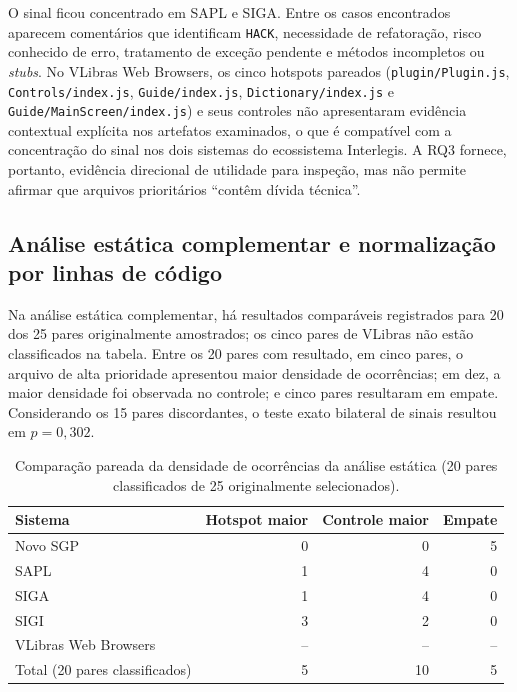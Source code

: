 \documentclass[12pt]{article}
\begin{document}
O sinal ficou concentrado em SAPL e SIGA. Entre os casos encontrados aparecem comentários que identificam \texttt{HACK}, necessidade de refatoração, risco conhecido de erro, tratamento de exceção pendente e métodos incompletos ou \emph{stubs}. No VLibras Web Browsers, os cinco hotspots pareados (\texttt{plugin/Plugin.js}, \texttt{Controls/index.js}, \texttt{Guide/index.js}, \texttt{Dictionary/index.js} e \texttt{Guide/MainScreen/index.js}) e seus controles não apresentaram evidência contextual explícita nos artefatos examinados, o que é compatível com a concentração do sinal nos dois sistemas do ecossistema Interlegis. A RQ3 fornece, portanto, evidência direcional de utilidade para inspeção, mas não permite afirmar que arquivos prioritários ``contêm dívida técnica''.

\subsection{Análise estática complementar e normalização por linhas de código}
Na análise estática complementar, há resultados comparáveis registrados para 20 dos 25 pares originalmente amostrados; os cinco pares de VLibras não estão classificados na tabela. Entre os 20 pares com resultado, em cinco pares, o arquivo de alta prioridade apresentou maior densidade de ocorrências; em dez, a maior densidade foi observada no controle; e cinco pares resultaram em empate. Considerando os 15 pares discordantes, o teste exato bilateral de sinais resultou em $p=0{,}302$.

\begin{table}[H]
\centering
\caption{Comparação pareada da densidade de ocorrências da análise estática (20 pares classificados de 25 originalmente selecionados).}
\label{tab:static-paired}
\small
\begin{tabular}{lrrr}
\toprule
\textbf{Sistema} & \textbf{Hotspot maior} & \textbf{Controle maior} & \textbf{Empate} \\
\midrule
Novo SGP & 0 & 0 & 5 \\
SAPL & 1 & 4 & 0 \\
SIGA & 1 & 4 & 0 \\
SIGI & 3 & 2 & 0 \\
VLibras Web Browsers & -- & -- & -- \\
\midrule
Total (20 pares classificados) & 5 & 10 & 5 \\
\bottomrule
\end{tabular}
\end{table}
\end{document}
